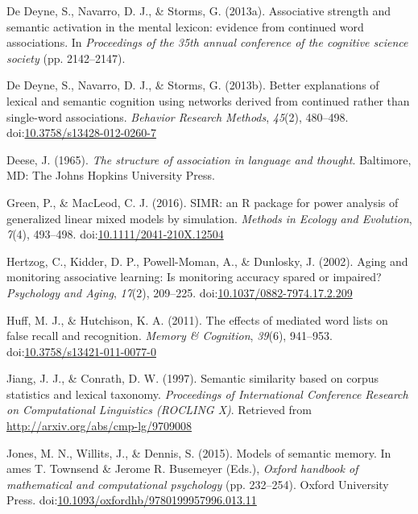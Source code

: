 \documentclass[english,,man]{apa6}
\begin{document}
\leavevmode\hypertarget{ref-DeDeyne2013a}{}%
De Deyne, S., Navarro, D. J., \& Storms, G. (2013a). Associative strength and semantic activation in the mental lexicon: evidence from continued word associations. In \emph{Proceedings of the 35th annual conference of the cognitive science society} (pp. 2142--2147).

\leavevmode\hypertarget{ref-DeDeyne2013}{}%
De Deyne, S., Navarro, D. J., \& Storms, G. (2013b). Better explanations of lexical and semantic cognition using networks derived from continued rather than single-word associations. \emph{Behavior Research Methods}, \emph{45}(2), 480--498. doi:\href{https://doi.org/10.3758/s13428-012-0260-7}{10.3758/s13428-012-0260-7}

\leavevmode\hypertarget{ref-Deese1965}{}%
Deese, J. (1965). \emph{The structure of association in language and thought}. Baltimore, MD: The Johns Hopkins University Press.

\leavevmode\hypertarget{ref-Green2016}{}%
Green, P., \& MacLeod, C. J. (2016). SIMR: an R package for power analysis of generalized linear mixed models by simulation. \emph{Methods in Ecology and Evolution}, \emph{7}(4), 493--498. doi:\href{https://doi.org/10.1111/2041-210X.12504}{10.1111/2041-210X.12504}

\leavevmode\hypertarget{ref-Hertzog2002}{}%
Hertzog, C., Kidder, D. P., Powell-Moman, A., \& Dunlosky, J. (2002). Aging and monitoring associative learning: Is monitoring accuracy spared or impaired? \emph{Psychology and Aging}, \emph{17}(2), 209--225. doi:\href{https://doi.org/10.1037/0882-7974.17.2.209}{10.1037/0882-7974.17.2.209}

\leavevmode\hypertarget{ref-Huff2011}{}%
Huff, M. J., \& Hutchison, K. A. (2011). The effects of mediated word lists on false recall and recognition. \emph{Memory \& Cognition}, \emph{39}(6), 941--953. doi:\href{https://doi.org/10.3758/s13421-011-0077-0}{10.3758/s13421-011-0077-0}

\leavevmode\hypertarget{ref-Jiang1997}{}%
Jiang, J. J., \& Conrath, D. W. (1997). Semantic similarity based on corpus statistics and lexical taxonomy. \emph{Proceedings of International Conference Research on Computational Linguistics (ROCLING X)}. Retrieved from \url{http://arxiv.org/abs/cmp-lg/9709008}

\leavevmode\hypertarget{ref-Jones2015}{}%
Jones, M. N., Willits, J., \& Dennis, S. (2015). Models of semantic memory. In ames T. Townsend \& Jerome R. Busemeyer (Eds.), \emph{Oxford handbook of mathematical and computational psychology} (pp. 232--254). Oxford University Press. doi:\href{https://doi.org/10.1093/oxfordhb/9780199957996.013.11}{10.1093/oxfordhb/9780199957996.013.11}
\end{document}
